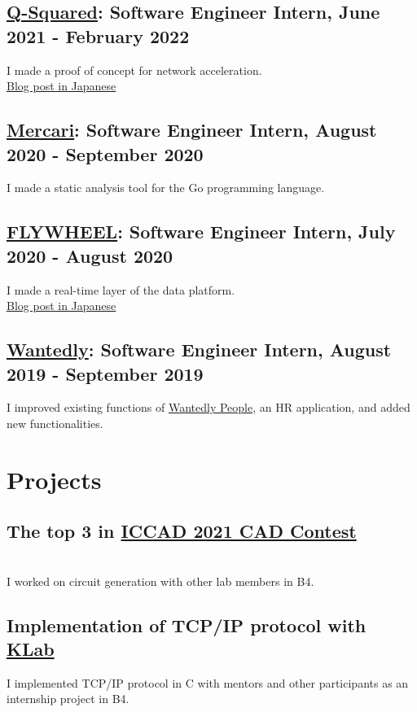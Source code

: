 \documentclass[12pt]{article}
\begin{document}
  \subsection*{\href{https://q-squared.jp}{Q-Squared}: Software Engineer Intern, June 2021 - February 2022}
    I made a proof of concept for network acceleration.
    \\
    \href{https://flossy-era-126.notion.site/DPDK-Potential-in-Finance-840b0d289273495192eb04d97d268eeb}{Blog post in Japanese}
  \subsection*{\href{https://about.mercari.com/en}{Mercari}: Software Engineer Intern, August 2020 - September 2020}
    I made a static analysis tool for the Go programming language.
  \subsection*{\href{https://www.flywheel.jp}{FLYWHEEL}: Software Engineer Intern, July 2020 - August 2020}
    I made a real-time layer of the data platform.
    \\
    \href{https://www.flywheel.jp/topics/20200917}{Blog post in Japanese}
  \subsection*{\href{https://wantedlyinc.com/ja}{Wantedly}: Software Engineer Intern, August 2019 - September 2019}
    I improved existing functions of \href{https://people.wantedly.com/}{Wantedly People}, an HR application, and added new functionalities.

\section*{Projects}
  \subsection*{The top 3 in \href{http://iccad-contest.org/2021/}{ICCAD 2021 CAD Contest}}
     \\
    I worked on circuit generation with other lab members in B4.
  \subsection*{Implementation of TCP/IP protocol with \href{https://www.klab.com/en/}{KLab}}
    I implemented TCP/IP protocol in C with mentors and other participants as an internship project in B4.
\end{document}
